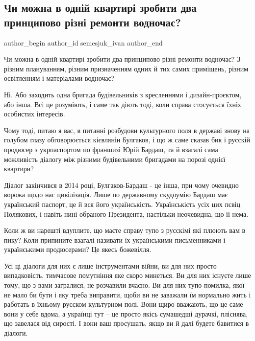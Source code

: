  
 
 
 
 
 
\subsection{Чи можна в одній квартирі зробити два принципово різні ремонти водночас?}
\label{sec:20_11_2020.fb.semesjuk_ivan.1.kvartira_dva_remonty}
\ifcmt
	author_begin
   author_id semesjuk_ivan
	author_end
\fi

Чи можна в одній квартирі зробити два принципово різні ремонти водночас? З
різним плануванням, різним призначенням одних й тих самих приміщень, різним
освітленням і матеріалами водночас?

Ні. Або заходить одна бригада будівельників з кресленнями і дизайн-проєктом,
або інша. Всі це розуміють, і саме так діють тоді, коли справа стосується їхніх
особистих інтересів. 

Чому тоді, питаю я вас, в питанні розбудови культурного поля в державі знову на
голубом глазу обговорюється кієвлянін Булгаков, і що ж саме сказав бик і
русскій продюсер з укрпаспортом по франшизі Юрій Бардаш, та й взагалі сама
можливість діалогу між різними будівельними бригадами на порозі однієї
квартири?

Діалог закінчився в 2014 році, Булгаков-Бардаш - це інша, при чому очевидно
ворожа щодо нас цивілізація. Лише по державному скудоумію Бардаш має
український паспорт, це й вся його українськість. Українськість усіх цих пєвіц
Полякових, і навіть нині обраного Президента, настільки неочевидна, що її нема.

Коли ж ви нарешті вдуплите, що маєте справу тупо з русскімі які плюють вам в
пику? Коли припините взагалі називати їх українськими письменниками і
українськими продюсерами? Це якесь божевілля.

Усі ці діалоги для них є лише інструментами війни, ви для них просто
випадковість, тимчасове помутніння яке скоро минеться. Ви для них існуєте лише
тому, що з вами загралися, не розчавили вчасно. Ви для них тупо помилка, якої
не мало би бути і яку треба виправити, щоби ви не заважали їм нормально жить і
работать в їхньому русском культурном полі. Вони щиро вважають, що це саме вони
у себе вдома, а українці тут – це просто якісь сумашедші дурачкі, пліснява, що
завелася від сирості. І вони ваш просушать, якщо ви й далі будете бавитися в
діалоги.

